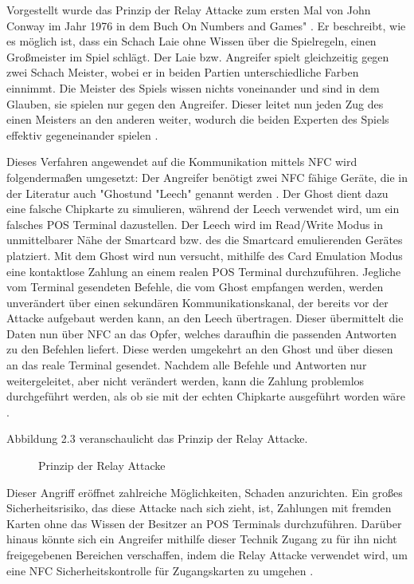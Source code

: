 Vorgestellt wurde das Prinzip der Relay Attacke zum ersten Mal von John Conway im Jahr 1976 in dem Buch \glqq On Numbers and Games" \textbf{\cite{Buchzitat}}. Er beschreibt, wie es möglich ist, dass ein Schach Laie ohne Wissen über die Spielregeln, einen Großmeister im Spiel schlägt. Der Laie bzw. Angreifer spielt gleichzeitig gegen zwei Schach Meister, wobei er in beiden Partien unterschiedliche Farben einnimmt. Die Meister des Spiels wissen nichts voneinander und sind in dem Glauben, sie spielen nur gegen den Angreifer. Dieser leitet nun jeden Zug des einen Meisters an den anderen weiter, wodurch die beiden Experten des Spiels effektiv gegeneinander spielen \textbf{\cite{Buchzitat}}. 

Dieses Verfahren angewendet auf die Kommunikation mittels NFC wird folgendermaßen umgesetzt: Der Angreifer benötigt zwei NFC fähige Geräte, die in der Literatur auch "Ghost\grqq und "Leech" genannt werden \cite{pickingVirtualPockets}. Der Ghost dient dazu eine falsche Chipkarte zu simulieren, während der Leech verwendet wird, um ein falsches POS Terminal dazustellen. Der Leech wird im Read/Write Modus in unmittelbarer Nähe der Smartcard bzw. des die Smartcard emulierenden Gerätes platziert. Mit dem Ghost wird nun versucht, mithilfe des Card Emulation Modus eine kontaktlose Zahlung an einem realen POS Terminal durchzuführen. Jegliche vom Terminal gesendeten Befehle, die vom Ghost empfangen werden, werden unverändert über einen sekundären Kommunikationskanal, der bereits vor der Attacke aufgebaut werden kann, an den Leech übertragen. Dieser übermittelt die Daten nun über NFC an das Opfer, welches daraufhin die passenden Antworten zu den Befehlen liefert. Diese werden umgekehrt an den Ghost und über diesen an das reale Terminal gesendet. Nachdem alle Befehle und Antworten nur weitergeleitet, aber nicht verändert werden, kann die Zahlung problemlos durchgeführt werden, als ob sie mit der echten Chipkarte ausgeführt worden wäre \cite{pickingVirtualPockets}.

Abbildung 2.3 veranschaulicht das Prinzip der Relay Attacke. 

\begin{figure}[h]
	\caption{Prinzip der Relay Attacke}
\end{figure}

Dieser Angriff eröffnet zahlreiche Möglichkeiten, Schaden anzurichten. Ein großes Sicherheitsrisiko, das diese Attacke nach sich zieht, ist, Zahlungen mit fremden Karten ohne das Wissen der Besitzer an POS Terminals durchzuführen. Darüber hinaus  könnte sich ein Angreifer mithilfe dieser Technik Zugang zu für ihn nicht freigegebenen Bereichen verschaffen, indem die Relay Attacke verwendet wird, um eine NFC Sicherheitskontrolle für Zugangskarten zu umgehen \cite{pickingVirtualPockets}.

